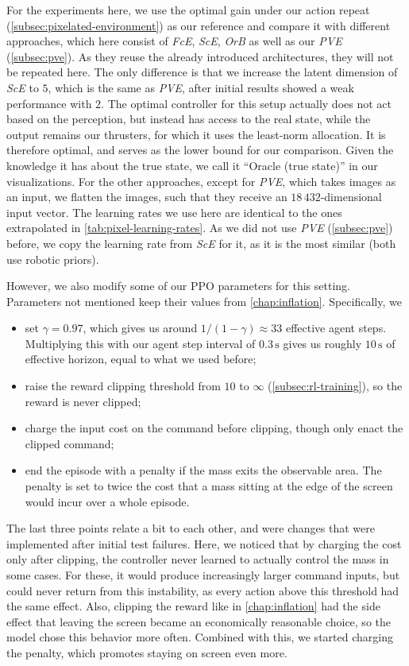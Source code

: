 For the experiments here, we use the optimal gain under our action repeat (\cref{subsec:pixelated-environment})
as our reference and compare it with different approaches,
which here consist of \emph{FcE}, \emph{ScE}, \emph{OrB} as well as our
\emph{PVE} (\cref{subsec:pve}). As they reuse the already introduced architectures,
they will not be repeated here. The only difference is that we increase the latent dimension of \emph{ScE}
to $5$, which is the same as \emph{PVE}, after initial results showed a weak performance with $2$.
The optimal controller for this setup actually does not
act based on the perception, but instead has access to the real state, while the output
remains our thrusters, for which it uses the least-norm allocation.
It is therefore optimal, and serves as the lower bound for our comparison. Given the knowledge it has about the true
state, we call it ``Oracle (true state)'' in our visualizations.
For the other approaches, except for \emph{PVE}, which takes images
as an input, we flatten the images, such that they receive an $18\,432$-dimensional input vector.
The learning rates we use here are identical to the ones extrapolated in \cref{tab:pixel-learning-rates}.
As we did not use \emph{PVE} (\cref{subsec:pve}) before, we copy the learning rate from \emph{ScE} for it, as it is the
most similar (both use robotic priors).

However, we also modify some of our PPO parameters for this setting. Parameters not mentioned
keep their values from \cref{chap:inflation}. Specifically, we
\begin{itemize}
    \item set $\gamma = 0.97$, which gives us around $1/(1-\gamma) \approx 33$ effective agent steps.
    Multiplying this with our agent step interval of $0.3\,\mathrm{s}$ gives us roughly $10\,\mathrm{s}$
    of effective horizon, equal to what we used before;
    \item raise the reward clipping threshold from $10$ to $\infty$ (\cref{subsec:rl-training}), so the reward is never clipped;
    \item charge the input cost on the command before clipping, though only enact the clipped command;
    \item end the episode with a penalty if the mass exits the observable area. The penalty is set to twice the
    cost that a mass sitting at the edge of the screen would incur over a whole episode.
\end{itemize}
The last three points relate a bit to each other, and were changes that were implemented after initial
test failures. Here, we noticed that by charging the cost only after clipping, the controller
never learned to actually control the mass in some cases. For these, it would produce increasingly larger
command inputs, but could never return from this instability, as every action above this threshold had the
same effect. Also, clipping the reward like in \cref{chap:inflation} had the side effect that leaving the
screen became an economically reasonable choice, so the model chose this behavior more often. Combined with
this, we started charging the penalty, which promotes staying on screen even more.

